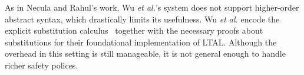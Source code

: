 \documentclass{llncs}
\begin{document}
As in Necula and Rahul's work, Wu {\em et al.}'s system does not
support higher-order abstract syntax, which drastically limits its
usefulness. Wu {\em et al.}\cite{Appel:PPDP03} encode the explicit
substitution calculus~\cite{Abadi:POPL90} together with the necessary
proofs about substitutions for their foundational implementation of
LTAL. Although the overhead in this setting is still manageable, it is
not general enough to handle richer safety polices.








\end{document}
